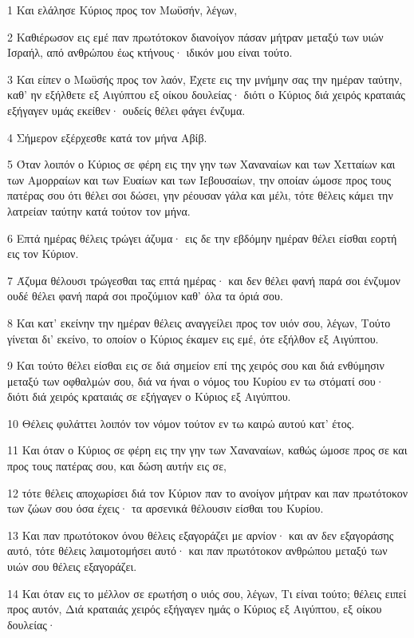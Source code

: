 \par 1 Και ελάλησε Κύριος προς τον Μωϋσήν, λέγων,
\par 2 Καθιέρωσον εις εμέ παν πρωτότοκον διανοίγον πάσαν μήτραν μεταξύ των υιών Ισραήλ, από ανθρώπου έως κτήνους· ιδικόν μου είναι τούτο.
\par 3 Και είπεν ο Μωϋσής προς τον λαόν, Έχετε εις την μνήμην σας την ημέραν ταύτην, καθ' ην εξήλθετε εξ Αιγύπτου εξ οίκου δουλείας· διότι ο Κύριος διά χειρός κραταιάς εξήγαγεν υμάς εκείθεν· ουδείς θέλει φάγει ένζυμα.
\par 4 Σήμερον εξέρχεσθε κατά τον μήνα Αβίβ.
\par 5 Όταν λοιπόν ο Κύριος σε φέρη εις την γην των Χαναναίων και των Χετταίων και των Αμορραίων και των Ευαίων και των Ιεβουσαίων, την οποίαν ώμοσε προς τους πατέρας σου ότι θέλει σοι δώσει, γην ρέουσαν γάλα και μέλι, τότε θέλεις κάμει την λατρείαν ταύτην κατά τούτον τον μήνα.
\par 6 Επτά ημέρας θέλεις τρώγει άζυμα· εις δε την εβδόμην ημέραν θέλει είσθαι εορτή εις τον Κύριον.
\par 7 Άζυμα θέλουσι τρώγεσθαι τας επτά ημέρας· και δεν θέλει φανή παρά σοι ένζυμον ουδέ θέλει φανή παρά σοι προζύμιον καθ' όλα τα όριά σου.
\par 8 Και κατ' εκείνην την ημέραν θέλεις αναγγείλει προς τον υιόν σου, λέγων, Τούτο γίνεται δι' εκείνο, το οποίον ο Κύριος έκαμεν εις εμέ, ότε εξήλθον εξ Αιγύπτου.
\par 9 Και τούτο θέλει είσθαι εις σε διά σημείον επί της χειρός σου και διά ενθύμησιν μεταξύ των οφθαλμών σου, διά να ήναι ο νόμος του Κυρίου εν τω στόματί σου· διότι διά χειρός κραταιάς σε εξήγαγεν ο Κύριος εξ Αιγύπτου.
\par 10 Θέλεις φυλάττει λοιπόν τον νόμον τούτον εν τω καιρώ αυτού κατ' έτος.
\par 11 Και όταν ο Κύριος σε φέρη εις την γην των Χαναναίων, καθώς ώμοσε προς σε και προς τους πατέρας σου, και δώση αυτήν εις σε,
\par 12 τότε θέλεις αποχωρίσει διά τον Κύριον παν το ανοίγον μήτραν και παν πρωτότοκον των ζώων σου όσα έχεις· τα αρσενικά θέλουσιν είσθαι του Κυρίου.
\par 13 Και παν πρωτότοκον όνου θέλεις εξαγοράζει με αρνίον· και αν δεν εξαγοράσης αυτό, τότε θέλεις λαιμοτομήσει αυτό· και παν πρωτότοκον ανθρώπου μεταξύ των υιών σου θέλεις εξαγοράζει.
\par 14 Και όταν εις το μέλλον σε ερωτήση ο υιός σου, λέγων, Τι είναι τούτο; θέλεις ειπεί προς αυτόν, Διά κραταιάς χειρός εξήγαγεν ημάς ο Κύριος εξ Αιγύπτου, εξ οίκου δουλείας·
